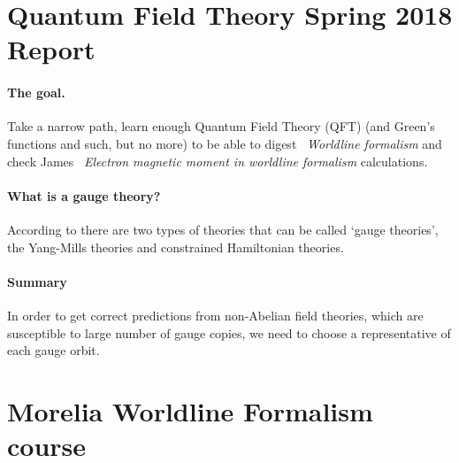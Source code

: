 
\section{Quantum Field Theory Spring 2018 Report}


\paragraph{The goal.}
    Take a narrow path, learn enough Quantum Field Theory (QFT) (and
    Green's functions and such, but no more) to be able to digest
    ~{\em Worldline formalism} and check James
    ~{\em Electron magnetic moment in
    worldline formalism} calculations.

 \paragraph{What is a gauge theory?}
According to there are two types of theories
that can be called \lq gauge theories\rq, the Yang-Mills theories and
constrained Hamiltonian theories.

\paragraph{Summary}
In order to get correct predictions from non-Abelian field theories,
which are susceptible to large number of gauge copies, we need to choose
a representative of each gauge orbit.

\section{Morelia Worldline Formalism course}
\label{c-MoreliaCourse}

